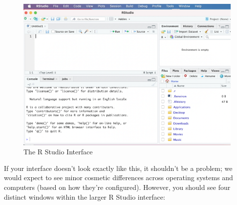 \documentclass[
]{article}
\begin{document}
\begin{figure}
\includegraphics[width=1\linewidth]{images/rstudio_window_revised} \caption{The R Studio Interface}\label{fig:unnamed-chunk-1}
\end{figure}

If your interface doesn't look exactly like this, it shouldn't be a problem; we would expect to see minor cosmetic differences across operating systems and computers (based on how they're configured). However, you should see four distinct windows within the larger R Studio interface:
\end{document}
